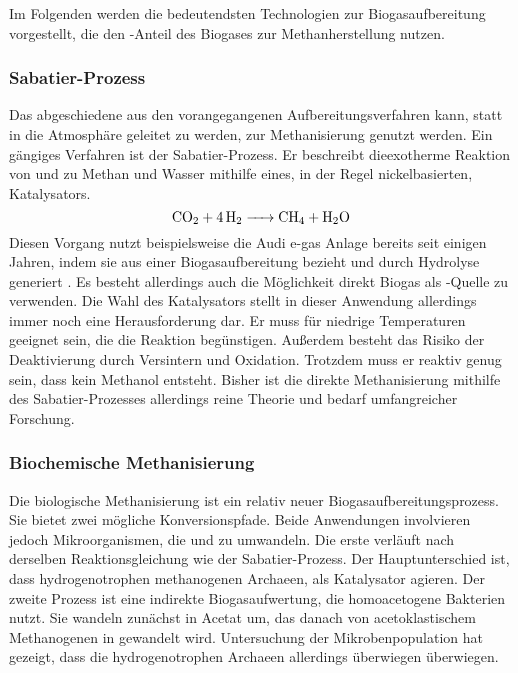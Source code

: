 Im Folgenden werden die bedeutendsten Technologien zur Biogasaufbereitung vorgestellt, die den -Anteil des Biogases zur Methanherstellung nutzen.


\subsubsection{Sabatier-Prozess}\label{chap:Sabatier}

Das abgeschiedene  aus den vorangegangenen Aufbereitungsverfahren kann, statt in die Atmosphäre geleitet zu werden, zur Methanisierung genutzt werden. Ein gängiges Verfahren ist der Sabatier-Prozess. Er beschreibt dieexotherme Reaktion von  und  zu Methan und Wasser mithilfe eines, in der Regel nickelbasierten, Katalysators. \parencite{AONC2019} 
\begin{equation}
	\ce{CO2 + 4H2 -> CH4 + H2O}
\end{equation}
Diesen Vorgang nutzt beispielsweise die Audi e-gas Anlage bereits seit einigen Jahren, indem sie  aus einer Biogasaufbereitung bezieht und  durch Hydrolyse generiert \parencite{audi13}. \parencite{AONC2019} \newline
Es besteht allerdings auch die Möglichkeit direkt Biogas als -Quelle zu verwenden. Die Wahl des Katalysators stellt in dieser Anwendung allerdings immer noch eine Herausforderung dar. Er muss für niedrige Temperaturen geeignet sein, die die Reaktion begünstigen. Außerdem besteht das Risiko der Deaktivierung durch Versintern und Oxidation. Trotzdem muss er reaktiv genug sein, dass kein Methanol entsteht. Bisher ist die direkte Methanisierung mithilfe des Sabatier-Prozesses allerdings reine Theorie und bedarf umfangreicher Forschung. 
\parencite{AONC2019}


\subsubsection{Biochemische Methanisierung}\label{chap:biochem} 

Die biologische Methanisierung ist ein relativ neuer Biogasaufbereitungsprozess. Sie bietet zwei mögliche Konversionspfade. Beide Anwendungen involvieren jedoch Mikroorganismen, die  und  zu  umwandeln. Die erste verläuft nach derselben Reaktionsgleichung wie der Sabatier-Prozess. Der Hauptunterschied ist, dass hydrogenotrophen methanogenen Archaeen, als Katalysator agieren. Der zweite Prozess ist eine indirekte Biogasaufwertung, die homoacetogene Bakterien nutzt. Sie wandeln  zunächst in Acetat um, das danach von acetoklastischem Methanogenen in  gewandelt wird. Untersuchung der Mikrobenpopulation hat gezeigt, dass die hydrogenotrophen Archaeen allerdings überwiegen überwiegen. \parencite{KGKK2019} \parencite{AONC2019} \parencite{VRM2019}

